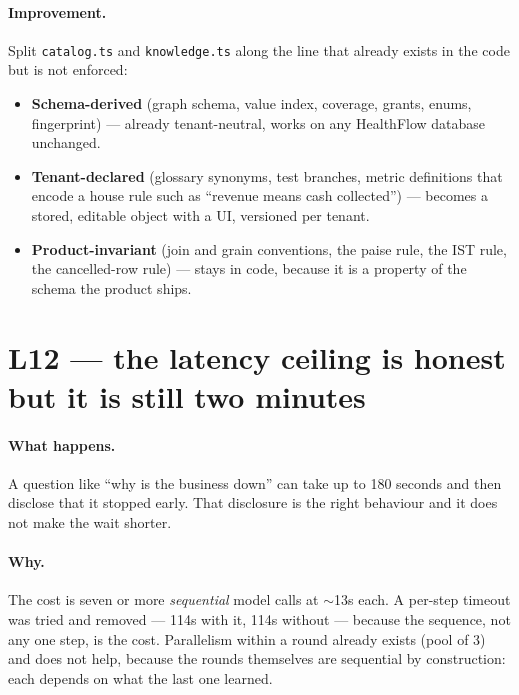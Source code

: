 \documentclass[11pt,a4paper]{report}
\newcommand{\file}[1]{\texttt{\small #1}}
\begin{document}
\paragraph{Improvement.} Split \file{catalog.ts} and \file{knowledge.ts} along the line that already
exists in the code but is not enforced:
\begin{itemize}[leftmargin=*,itemsep=1pt]
\item \textbf{Schema-derived} (graph schema, value index, coverage, grants, enums, fingerprint) ---
      already tenant-neutral, works on any HealthFlow database unchanged.
\item \textbf{Tenant-declared} (glossary synonyms, test branches, metric definitions that encode a
      house rule such as ``revenue means cash collected'') --- becomes a stored, editable object
      with a UI, versioned per tenant.
\item \textbf{Product-invariant} (join and grain conventions, the paise rule, the IST rule, the
      cancelled-row rule) --- stays in code, because it is a property of the schema the product
      ships.
\end{itemize}

\section{L12 --- the latency ceiling is honest but it is still two minutes}

\paragraph{What happens.} A question like ``why is the business down'' can take up to 180 seconds
and then disclose that it stopped early. That disclosure is the right behaviour and it does not make
the wait shorter.

\paragraph{Why.} The cost is seven or more \emph{sequential} model calls at $\sim$13s each. A
per-step timeout was tried and removed --- 114s with it, 114s without --- because the sequence, not
any one step, is the cost. Parallelism within a round already exists (pool of 3) and does not help,
because the rounds themselves are sequential by construction: each depends on what the last one
learned.
\end{document}
